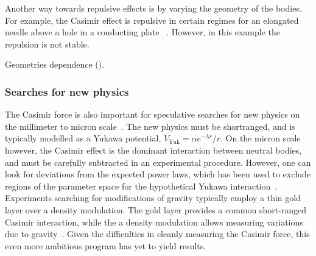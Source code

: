 Another way towards repulsive effects is by varying the geometry of the bodies.  
For example, the Casimir effect is repulsive in certain regimes for an elongated needle above a hole in a conducting plate~
\cite{Levin2010}.  However, in this example the repulsion is not stable. 

    Geometries dependence ().
    


\subsubsection{Searches for new physics}

The Casimir force is also important for speculative searches for new physics on the millimeter to micron
scale~\cite{Dimopoulos2003, Bezerra2011}.  The new physics must be shortranged, and is typically modelled as 
a Yukawa potential, $V_{\text{Yuk}}=\alpha e^{-\lambda r}/r$.  
On the micron scale however, the Casimir effect is the dominant interaction between neutral bodies,
 and must be carefully subtracted in an experimental procedure.
 However, one can look for deviations from the expected 
power laws, which has been used to exclude regions of the parameter space for the hypothetical
Yukawa interaction~\cite{Lamoreaux1997,Obrecht2007,Bezerra2011}.  
Experiments searching for modifications of gravity typically employ a thin gold layer over
a density modulation.  The gold layer provides a common short-ranged Casimir interaction, while the 
a density modulation allows measuring variations due to gravity~\cite{Sorrentino2009, Geraci2015}.
Given the difficulties in cleanly measuring the Casimir force, this even more ambitious program has yet 
to yield results.  

